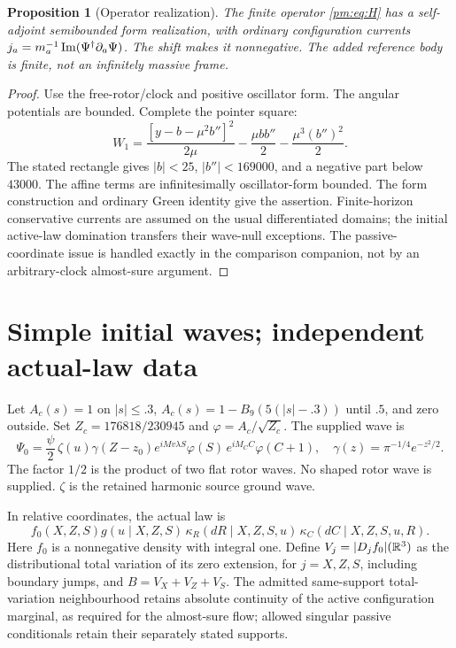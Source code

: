 \documentclass[11pt]{article}
\newtheorem{proposition}[theorem]{Proposition}
\theoremstyle{definition}\newtheorem{definition}[theorem]{Definition}
\theoremstyle{remark}\newtheorem{remark}[theorem]{Remark}
\begin{document}
\begin{proposition}[Operator realization]
The finite operator \eqref{pm:eq:H} has a self-adjoint semibounded form realization, with ordinary configuration currents $j_a=m_a^{-1}\operatorname{Im}(\Psi^\dagger\partial_a\Psi)$. The shift makes it nonnegative. The added reference body is finite, not an infinitely massive frame.
\end{proposition}
\begin{proof}
Use the free-rotor/clock and positive oscillator form. The angular potentials are bounded. Complete the pointer square:
\[
 W_1=\frac{[y-b-\mu^2b'']^2}{2\mu}
 -\frac{\mu bb''}{2}-\frac{\mu^3(b'')^2}{2}.
\]
The stated rectangle gives $|b|<25$, $|b''|<169000$, and a negative part below $43000$. The affine terms are infinitesimally oscillator-form bounded. The form construction and ordinary Green identity give the assertion. Finite-horizon conservative currents are assumed on the usual differentiated domains; the initial active-law domination transfers their wave-null exceptions. The passive-coordinate issue is handled exactly in the comparison companion, not by an arbitrary-clock almost-sure argument.
\end{proof}

\section{Simple initial waves; independent actual-law data}
Let $A_c(s)=1$ on $|s|\le.3$, $A_c(s)=1-B_9(5(|s|-.3))$ until $.5$, and zero outside. Set $Z_c=176818/230945$ and $\varphi=A_c/\sqrt{Z_c}$. The supplied wave is
\[
 \Psi_0=\frac{\psi}{2}\,\zeta(u)\gamma(Z-z_0)
 e^{iMv\lambda S}\varphi(S)\,
 e^{iM_CC}\varphi(C+1),
 \quad \gamma(z)=\pi^{-1/4}e^{-z^2/2}.
\]
The factor $1/2$ is the product of two flat rotor waves. No shaped rotor wave is supplied. $\zeta$ is the retained harmonic source ground wave.

In relative coordinates, the actual law is
\[
 f_0(X,Z,S)g(u\mid X,Z,S)\,
 \kappa_R(dR\mid X,Z,S,u)\,
 \kappa_C(dC\mid X,Z,S,u,R).
\]
Here $f_0$ is a nonnegative density with integral one. Define
$V_j=|D_j f_0|(\mathbb R^3)$ as the distributional total variation of its
zero extension, for $j=X,Z,S$, including boundary jumps, and
$B=V_X+V_Z+V_S$. The admitted same-support total-variation neighbourhood
retains absolute continuity of the active configuration marginal,
as required for the almost-sure flow; allowed singular passive
conditionals retain their separately stated supports.
\end{document}
